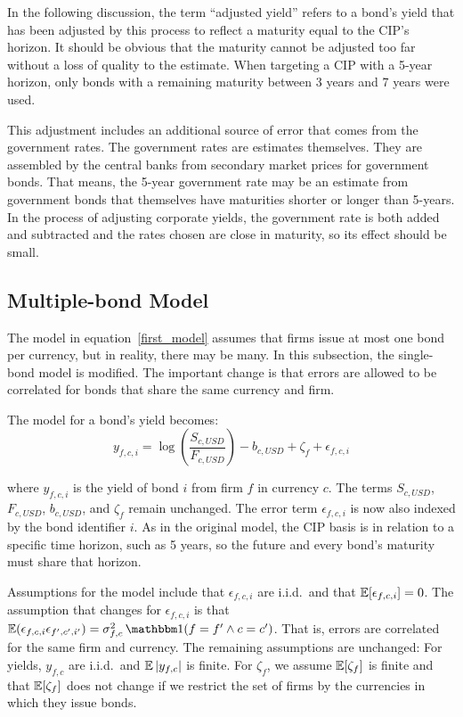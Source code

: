 In the following discussion, the term ``adjusted yield'' refers to a bond's yield that has been adjusted by this process to reflect a maturity equal to the CIP's horizon.  It should be obvious that the maturity cannot be adjusted too far without a loss of quality to the estimate.  When targeting a CIP with a 5-year horizon, only bonds with a remaining maturity between 3 years and 7 years were used.  


This adjustment includes an additional source of error that comes from the government rates.  The government rates are estimates themselves.  They are assembled by the central banks from secondary market prices for government bonds.  That means, the 5-year government rate may be an estimate from government bonds that themselves have maturities shorter or longer than 5-years.  In the process of adjusting corporate yields, the government rate is both added and subtracted and the rates chosen are close in maturity, so its effect should be small.

\subsection{Multiple-bond Model}

The model in equation~\ref{first_model} assumes that firms issue at most one bond per currency, but in reality, there may be many.  In this subsection, the single-bond model is modified.  The important change is that errors are allowed to be correlated for bonds that share the same currency and firm.  


The model for a bond's yield becomes:
\begin{equation}
  \label{second_model}
 y_{f,c,i} = \log\left(\frac{S_{c,USD}}{F_{c,USD}}\right) - b_{c,USD} + \zeta_{f} + \epsilon_{f,c,i} 
\end{equation}

\noindent where $y_{f,c,i}$ is the yield of bond $i$ from firm $f$ in currency $c$.  The terms $S_{c,USD}$, $F_{c,USD}$, $b_{c,USD}$, and $\zeta_{f}$ remain unchanged.  The error term $\epsilon_{f,c,i}$ is now also indexed by the bond identifier $i$.   As in the original model, the CIP basis is in relation to a specific time horizon, such as 5 years, so the future and every bond's maturity must share that horizon.

Assumptions for the model include that $\epsilon_{f,c,i}$ are i.i.d.\ and that $\operatorname{\mathbb{E}}[\epsilon_{f,c,i}] = 0$.  The assumption that changes for $\epsilon_{f,c,i}$ is that $\E(\epsilon_{f,c,i}\epsilon_{f',c',i'}) = \sigma_{f,c}^2\ind(f=f' \land c=c')$.  That is, errors are correlated for the same firm and currency.  The remaining assumptions are unchanged:  For yields, $y_{f,c}$ are i.i.d.\ and $\operatorname{\mathbb{E}}|y_{f,c}|$ is finite.  For $\zeta_f$, we assume $\operatorname{\mathbb{E}}[\zeta_f]$ is finite and that $\operatorname{\mathbb{E}}[\zeta_f]$ does not change if we restrict the set of firms by the currencies in which they issue bonds.  


